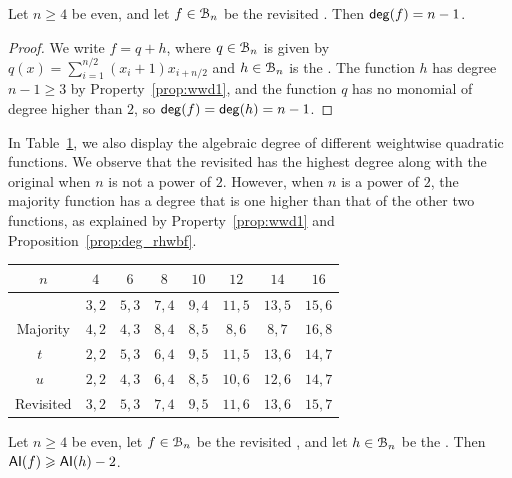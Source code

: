 \documentclass{llncs}
\begin{document}
\begin{proposition}\label{prop:deg_rhwbf}
	Let $n\geq 4$ be even, and let $f\in\mathcal{B}_n$ be the revisited \hwbf{}. Then $\mathsf{deg}(f)=n-1$.
\end{proposition}
\begin{proof}
	We write $f=q+h$, where $q\in\mathcal{B}_n$ is given by $q(x)=\sum_{i=1}^{n/2} (x_i+1) x_{i+n/2}$ and $h\in\mathcal{B}_n$ is the \hwbf{}. The function $h$ has degree $n-1\geq 3$ by Property~\ref{prop:wwd1}, and the function $q$ has no monomial of degree higher than $2$, so $\mathsf{deg}(f)=\mathsf{deg}(h)=n-1$.
\end{proof}

In Table~\ref{table:comparisonsDegAI}, we also display the algebraic degree of different weightwise quadratic functions. We observe that the revisited \hwbf{} has the highest degree along with the original \hwbf{} when $n$ is not a power of $2$. However, when $n$ is a power of $2$, the majority function has a degree that is one higher than that of the other two functions, as explained by Property~\ref{prop:wwd1} and Proposition~\ref{prop:deg_rhwbf}.

\begin{table}
	\scriptsize
	\centering
	\begin{tabular}{|c|c|c|c|c|c|c|c|}
		\hline
		$n$ & $4$  & $6$  & $8$  &  $10$ & $12$ & $14$ & $16$  \\
		\hline
		\hwbf{}   & $3, 2$  & $5, 3$  & $7, 4$  &  $9, 4$ & $11, 5$ & $13, 5$ & $15, 6$  \\  	
		Majority   & $4, 2$  & $4, 3$  & $8, 4$  &  $8, 5$ & $8, 6$ & $8, 7$ & $16, 8$  \\
		$t$~\cite{DAM:MeaOza24}   & $2, 2$  & $5, 3$  & $6, 4$  &  $9, 5$ & $11, 5$ & $13, 6$ & $14, 7$\\
		$u$~\cite{DAM:MeaOza24}   & $2, 2$  & $4, 3$  & $6, 4$  &  $8, 5$ & $10, 6$ & $12, 6$ & $14, 7$ \\
		Revisited \hwbf{}  & $3, 2$  & $5, 3$  & $7, 4$  &  $9, 5$ & $11, 6$ & $13, 6$ & $15, 7$\\
		\hline
	\end{tabular}
	\label{table:comparisonsDegAI}
\end{table}

\begin{proposition}
	Let $n\geq 4$ be even, let $f\in\mathcal{B}_n$ be the revisited \hwbf{}, and let $h\in\mathcal{B}_n$ be the \hwbf{}. Then $\mathsf{AI}(f)\geqslant \mathsf{AI}(h)-2$.
\end{proposition}
\end{document}
